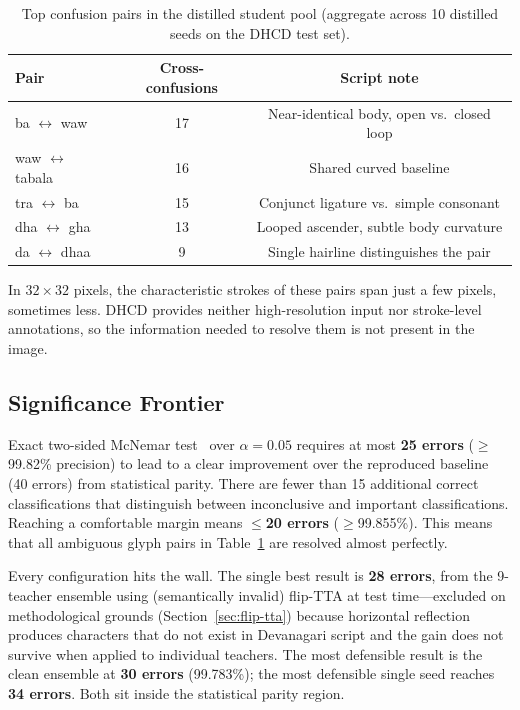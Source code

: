 \begin{table}[t]\centering
\caption{Top confusion pairs in the distilled student pool (aggregate
  across 10 distilled seeds on the DHCD test set).}
\label{tab:confusions}
\begin{tabular}{lcc}\toprule
Pair & Cross-confusions & Script note \\\midrule
ba $\leftrightarrow$ waw    & 17 & Near-identical body, open vs.\ closed loop \\
waw $\leftrightarrow$ tabala & 16 & Shared curved baseline \\
tra $\leftrightarrow$ ba    & 15 & Conjunct ligature vs.\ simple consonant \\
dha $\leftrightarrow$ gha   & 13 & Looped ascender, subtle body curvature \\
da $\leftrightarrow$ dhaa   & 9  & Single hairline distinguishes the pair \\\bottomrule
\end{tabular}
\end{table}

In $32{\times}32$ pixels, the characteristic strokes of these pairs span just a few pixels, sometimes less. DHCD provides neither high-resolution input nor stroke-level annotations, so the information needed to resolve them is not present in the image.

\subsection{Significance Frontier}
\label{sec:sig-frontier}

Exact two-sided McNemar test~\cite{mcnemar1947} over $\alpha = 0.05$ requires at most \textbf{25 errors} ($\geq$99.82\% precision) to lead to a clear improvement over the reproduced baseline (40 errors) from statistical parity. There are fewer than 15 additional correct classifications that distinguish between inconclusive and important classifications. Reaching a comfortable margin means $\leq$\textbf{20 errors} ($\geq$99.855\%). This means that all ambiguous glyph pairs in Table~\ref{tab:confusions} are resolved almost perfectly.

Every configuration hits the wall. The single best result is \textbf{28 errors}, from the 9-teacher ensemble using (semantically invalid) flip-TTA at test time---excluded on methodological grounds (Section~\ref{sec:flip-tta}) because horizontal reflection produces characters that do not exist in Devanagari script and the gain does not survive when applied to individual teachers. The most defensible result is the clean ensemble at \textbf{30 errors} (99.783\%); the most defensible single seed reaches \textbf{34 errors}. Both sit inside the statistical parity region.

